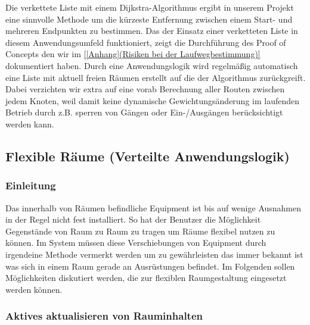 Die verkettete Liste mit einem Dijkstra-Algorithmus ergibt in unserem Projekt
eine sinnvolle Methode um die kürzeste Entfernung zwischen einem Start- und
mehreren Endpunkten zu bestimmen.
Das der Einsatz einer verketteten Liste in diesem Anwendungsumfeld
funktioniert, zeigt die Durchführung des Proof of Concepts den wir im \ref{[Anhang](Risiken bei der Laufwegbestimmung)}
dokumentiert haben. Durch eine Anwendungslogik wird regelmäßig automatisch
eine Liste mit aktuell freien Räumen erstellt auf die der Algorithmus
zurückgreift. Dabei verzichten wir extra auf eine vorab Berechnung aller
Routen zwischen jedem Knoten, weil damit keine dynamische Gewichtungsänderung
im laufenden Betrieb durch z.B. sperren von Gängen oder Ein-/Ausgängen
berücksichtigt werden kann.


\subsection{Flexible Räume (Verteilte Anwendungslogik)}
\label{sec:Flexible Räume (Verteilte Anwendungslogik)}

\subsubsection{Einleitung}
\label{sec:Flexible Räume (Verteilte Anwendungslogik) Einleitung}

Das innerhalb von Räumen befindliche Equipment ist bis auf wenige Ausnahmen in
der Regel nicht fest installiert. So hat der Benutzer die Möglichkeit
Gegenstände von Raum zu Raum zu tragen um Räume flexibel nutzen zu können.
Im System müssen diese Verschiebungen von Equipment durch irgendeine Methode
vermerkt werden um zu gewährleisten das immer bekannt ist was sich in einem
Raum gerade an Ausrüstungen befindet. Im Folgenden sollen Möglichkeiten
diskutiert werden, die zur flexiblen Raumgestaltung eingesetzt werden können.

\subsubsection{Aktives aktualisieren von Rauminhalten}
\label{sec:Aktives aktualisieren von Rauminhalten}

